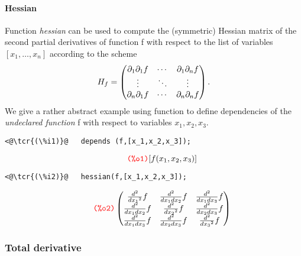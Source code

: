 \documentclass[../Maxima_Workbook.tex]{subfiles}
\begin{document}
\paragraph{Hessian} \mbox{}

\lz {} \hfill \tcr{[function]}

\lz Function \emph{hessian} can be used to compute the (symmetric) Hessian matrix of the second partial derivatives of function f with respect to the list of variables $ [x_1,\dots,x_n] $ according to the scheme
\begin{equation*}
	H_{f} = \begin{pmatrix}
	\partial_1 \partial_1 f & \cdots & \partial_1 \partial_n f \\ \vdots & \ddots & \vdots \\ \partial_n \partial_1 f & \cdots & \partial_n \partial_n f \end{pmatrix}.
\end{equation*}
We give a rather abstract example using function  to define dependencies of the \emph{undeclared function} f with respect to variables $ x_1, x_2, x_3 $.

\lz \begin{small}
\color{blue} \leqn
\begin{lstlisting}
<@\tcr{(\%i1)}@   depends (f,[x_1,x_2,x_3]);
\end{lstlisting}
\vspace{-5mm} \[\tag*{\tcr{\ttfamily (\%o1)}} [f(x_1,x_2,x_3)] \]
\vspace{-10mm} \begin{lstlisting}
<@\tcr{(\%i2)}@   hessian(f,[x_1,x_2,x_3]);
\end{lstlisting}
\vspace{-6mm} \[\tag*{\tcr{\ttfamily (\%o2)}} \begin{pmatrix} \frac{d^2}{d {{{x_1}}^{2}}} f & \frac{d^2}{d {x_1} d {x_2}} f & \frac{d^2}{d {x_1} d {x_3}} f\\
\frac{d^2}{d {x_1} d {x_2}} f & \frac{d^2}{d {{{x_2}}^{2}}} f & \frac{d^2}{d {x_2} d {x_3}} f\\
\frac{d^2}{d {x_1} d {x_3}} f & \frac{d^2}{d {x_2} d {x_3}} f & \frac{d^2}{d {{{x_3}}^{2}}} f \end{pmatrix} \]
\color{black} \reqn
\end{small} \vspace{-4mm} 

\subsubsection{Total derivative}
\end{document}
